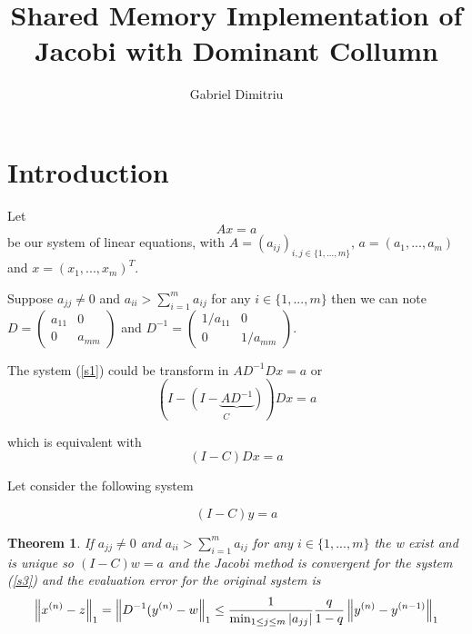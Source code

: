\documentclass[a4paper]{article}
\newtheorem{theorem}{Theorem}
\begin{document}
\title{Shared Memory Implementation of Jacobi with Dominant Collumn}
\date{}
\author{Gabriel Dimitriu}
\maketitle

\section{\protect\bigskip Introduction}

Let 
\begin{equation}
Ax=a  \label{s1}
\end{equation}%
be our system of linear equations, with $A=(a_{ij})_{i,j\in \{1,...,m\}}$, $%
a=(a_{1},...,a_{m})$ and $x=(x_{1},...,x_{m})^{T}$.

Suppose $a_{jj}\neq 0$ and $a_{ii}>\sum_{i=1}^{m}a_{ij}$ for any $i\in
\{1,...,m\}$ then we can note $D=%
\begin{pmatrix}
a_{11} & 0 \\ 
0 & a_{mm}%
\end{pmatrix}%
$ and $D^{-1}=%
\begin{pmatrix}
1/a_{11} & 0 \\ 
0 & 1/a_{mm}%
\end{pmatrix}%
$.

The system (\ref{s1}) could be transform in $AD^{-1}Dx=a$ or%
\begin{equation*}
\left( I-\underset{C}{\left( I-\underbrace{AD^{-1}}\right) }\right) Dx=a
\end{equation*}

which is equivalent with%
\begin{equation}
(I-C)Dx=a  \label{s2}
\end{equation}

Let consider the following system

\begin{equation}
(I-C)y=a  \label{s3}
\end{equation}

\begin{theorem}
If $a_{jj}\neq 0$ and $a_{ii}>\sum_{i=1}^{m}a_{ij}$ for any $i\in
\{1,...,m\} $ the w exist and is unique so $(I-C)w=a$ and the Jacobi method
is convergent for the system (\ref{s3}) and the evaluation error for the
original system is%
\begin{equation*}
\left\Vert x^{(n)}-z\right\Vert _{1}=\left\Vert D^{-1}(y^{(n)}-w\right\Vert
_{1}\leq \frac{1}{\min_{1\leq j\leq m}\left\vert a_{jj}\right\vert }\frac{q}{%
1-q}\left\Vert y^{(n)}-y^{(n-1)}\right\Vert _{1}
\end{equation*}
\end{theorem}
\end{document}
